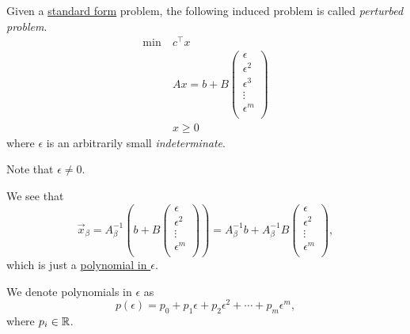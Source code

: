 \begin{definition}\label{def:perturbed-problem}
	Given a \hyperref[def:standard-form]{standard form} problem, the following induced problem is called \emph{perturbed problem}.
	\begin{align*}
		\min~ & c^{\top} x               \\
		      & Ax = b + B\begin{pmatrix}
			                  \epsilon   \\
			                  \epsilon^2 \\
			                  \epsilon^3 \\
			                  \vdots     \\
			                  \epsilon^m \\
		                  \end{pmatrix} \\
		      & x\geq 0
	\end{align*}
	where \(\epsilon \) is an arbitrarily small \emph{indeterminate}.
\end{definition}

\begin{remark}
	Note that \(\epsilon \neq 0\).
\end{remark}

\begin{note}
	We see that
	\[
		\vec{x}_{\beta} = A^{-1}_{\beta}\left(b + B\begin{pmatrix}
				\epsilon   \\
				\epsilon^2 \\
				\vdots     \\
				\epsilon^m \\
			\end{pmatrix}\right) = A^{-1}_{\beta}b + A^{-1}_{\beta}B\begin{pmatrix}
			\epsilon   \\
			\epsilon^2 \\
			\vdots     \\
			\epsilon^m \\
		\end{pmatrix},
	\]
	which is just a \hyperref[def:polynomial-in-epsilon]{polynomial in \(\epsilon\)}.
\end{note}

\begin{definition}\label{def:polynomial-in-epsilon}
	We denote polynomials in \(\epsilon\) as
	\[
		p(\epsilon) = p_0 + p_1\epsilon + p_2 \epsilon^2 + \cdots + p_{m}\epsilon^m,
	\]
	where \(p_i\in\mathbb{\MakeUppercase{r}}\).
\end{definition}

